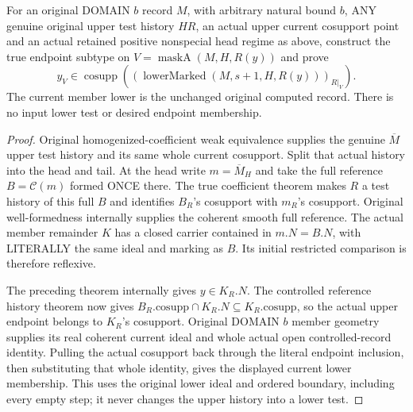 \begin{theorem}
\label{hir:original-positive-member-computed-current-cosupport}
\leanok
For an original DOMAIN $b$ record $M$, with arbitrary natural bound $b$,
ANY genuine original upper test
history $H R$, an actual upper current cosupport point and an actual
retained positive nonspecial head regime as above, construct the true
endpoint subtype on $V=\operatorname{maskA}(M,H,R(y))$ and prove
\[
 y_V\in\operatorname{cosupp}
   \left((\operatorname{lowerMarked}(M,s+1,H,R(y)))_{R|_V}\right).
\]
The current member lower is the unchanged original computed record.
There is no input lower test or desired endpoint membership.
\end{theorem}
\begin{proof}
Original homogenized-coefficient weak equivalence supplies the genuine
$\overline M$ upper test history and its same whole current cosupport.
Split that actual history into the head and tail. At the head write
$m=\overline M_H$ and take the full reference $B=\mathcal C(m)$ formed
ONCE there. The true coefficient theorem makes $R$ a test history of
this full $B$ and identifies $B_R$'s cosupport with $m_R$'s cosupport.
Original well-formedness internally supplies the coherent smooth full
reference. The actual member remainder $K$ has a closed carrier
contained in $m.N=B.N$, with LITERALLY the same ideal and marking as
$B$. Its initial restricted comparison is therefore reflexive.

The preceding theorem internally gives $y\in K_R.N$. The controlled
reference history theorem now gives
$B_R.\mathrm{cosupp}\cap K_R.N\subseteq K_R.\mathrm{cosupp}$,
so the actual upper endpoint belongs to $K_R$'s cosupport. Original
DOMAIN $b$ member geometry supplies its real coherent current ideal and
whole actual open controlled-record identity. Pulling the actual
cosupport back through the literal endpoint inclusion, then substituting
that whole identity, gives the displayed current lower membership.
This uses the original lower ideal and ordered boundary, including every
empty step; it never changes the upper history into a lower test.
\end{proof}

